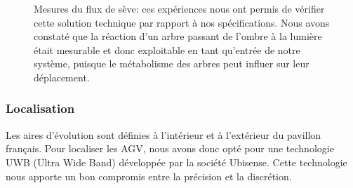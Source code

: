 \documentclass[french,A4paper,]{book}
\begin{document}
\begin{figure}
\centering

\hspace*{\fill}
\hfill%
\hspace*{\fill}

\caption{Mesures du flux de sève: ces expériences nous ont permis de
vérifier cette solution technique par rapport à nos spécifications. Nous
avons constaté que la réaction d'un arbre passant de l'ombre à la
lumière était mesurable et donc exploitable en tant qu'entrée de notre
système, puisque le métabolisme des arbres peut influer sur leur
déplacement.}

\label{fig:granier}

\end{figure}

\subsubsection{Localisation}\label{sec:transloc}

Les aires d'évolution sont définies à l'intérieur et à l'extérieur du
pavillon français. Pour localiser les AGV, nous avons donc opté pour une
technologie UWB (Ultra Wide Band) développée par la société Ubisense.
Cette technologie nous apporte un bon compromis entre la précision et la
discrétion.
\end{document}
